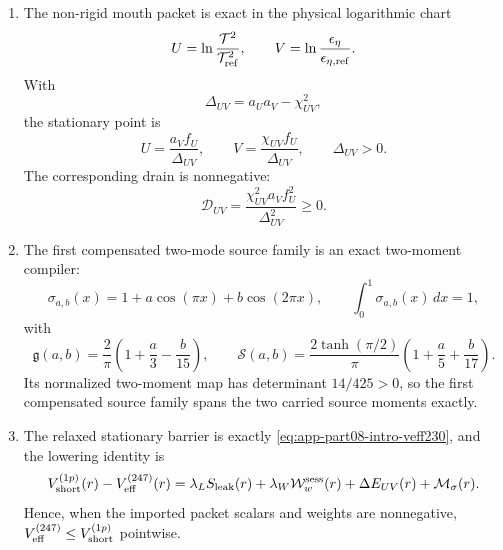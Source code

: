 \begin{theorem}
\begin{enumerate}[leftmargin=2.2em]
  \item The non-rigid mouth packet is exact in the physical logarithmic chart
  \begin{equation}
  \label{eq:app-part08-main-uv-chart}
  U=\ln\frac{\mathcal T^2}{\mathcal T_{\rm ref}^2},
  \qquad
  V=\ln\frac{\epsilon_\eta}{\epsilon_{\eta,{\rm ref}}}.
  \end{equation}
  With
  \begin{equation}
  \label{eq:app-part08-main-delta-uv}
  \Delta_{UV}=a_Ua_V-\chi_{UV}^{2},
  \end{equation}
  the stationary point is
  \begin{equation}
  \label{eq:app-part08-main-uv-stationary}
  U=\frac{a_Vf_U}{\Delta_{UV}},
  \qquad
  V=\frac{\chi_{UV}f_U}{\Delta_{UV}},
  \qquad
  \Delta_{UV}>0.
  \end{equation}
  The corresponding drain is nonnegative:
  \begin{equation}
  \label{eq:app-part08-main-uv-drain}
  \mathcal D_{UV}=\frac{\chi_{UV}^{2}a_Vf_U^2}{\Delta_{UV}^{2}}\ge 0.
  \end{equation}
  \item The first compensated two-mode source family is an exact two-moment compiler:
  \begin{equation}
  \label{eq:app-part08-main-source-family}
  \sigma_{a,b}(x)=1+a\cos(\pi x)+b\cos(2\pi x),
  \qquad
  \int_0^1\sigma_{a,b}(x)\,dx=1,
  \end{equation}
  with
  \begin{equation}
  \label{eq:app-part08-main-source-moments}
  \mathfrak g(a,b)=\frac{2}{\pi}\left(1+\frac{a}{3}-\frac{b}{15}\right),
  \qquad
  \mathcal S(a,b)=\frac{2\tanh(\pi/2)}{\pi}\left(1+\frac{a}{5}+\frac{b}{17}\right).
  \end{equation}
  Its normalized two-moment map has determinant \(14/425>0\), so the first compensated source family spans the two carried source moments exactly.
  \item The relaxed stationary barrier is exactly \cref{eq:app-part08-intro-veff230}, and the lowering identity is
  \begin{equation}
  \label{eq:app-part08-main-lowering-identity}
  V_{\rm short}^{(1p)}(r)-V_{\rm eff}^{(247)}(r)
  =
  \lambda_LS_{\rm leak}(r)
  +\lambda_W\mathcal W_w^{\rm sess}(r)
  +\Delta E_{UV}(r)
  +\mathcal M_\sigma(r).
  \end{equation}
  Hence, when the imported packet scalars and weights are nonnegative, \(V_{\rm eff}^{(247)}\le V_{\rm short}^{(1p)}\) pointwise.

\end{enumerate}
\end{theorem}

